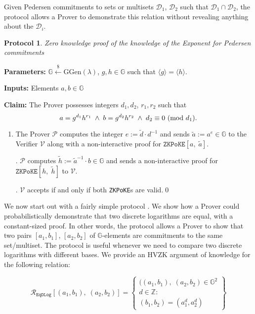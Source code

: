 \documentclass[11pt, lettersize, notitlepage, leqno, footskip=0.6cm]{article}
\newcommand{\ttt}{\texttt}
\newcommand{\bG}{\mathbb{G}}
\newcommand{\la}{\langle}
\newcommand{\ra}{\rangle}
\newcommand{\wti}{\widetilde}
\newcommand{\mc}{\mathcal}
\newcommand{\mb}{\mathbb}
\newcommand{\mr}{\mathrm}
\newcommand{\lamb}{\lambda}
\newcommand{\mP}{\mc{P}}
\newcommand{\V}{\mc{V}}
\newcommand{\vs}{\vspace{-0.15cm}}
\newcommand{\noin}{\noindent}
\newcommand{\Mod}[1]{\ (\mathrm{mod}\ #1)}
\newtheorem{Prot}[Thm]{Protocol}
\numberwithin{equation}{section}
\begin{document}
\noin Given Pedersen commitments to sets or multisets $\mc{D}_1$, $\mc{D}_2$ such that $\mc{D}_1\cap \mc{D}_2$, the protocol allows a Prover to demonstrate this relation without revealing anything about the $\mc{D}_i$.

\begin{Prot} \normalfont \hypertarget{ZKPoKEPed}{\textit{Zero knowledge proof of the knowledge of the Exponent for Pedersen commitments}} \end{Prot} \vspace{-0.3cm}

\noin \textbf{Parameters:} $\mb{G}\xleftarrow{\$} \mr{GGen}(\lamb)$,  $g,h\in \mb{G}$ such that $\la g \ra = \la h \ra$.

\noin \textbf{Inputs:} Elements $a,b\in\bG$

\noin \textbf{Claim:} The Prover possesses integers $d_1,d_2$, $r_1,r_2$ such that \vs $$a = g^{d_1}h^{r_1} \;\wedge\; b = g^{d_2}h^{r_2} \;\wedge\; d_2\equiv 0\Mod{d_1} . \vs $$

\begin{enumerate}[wide, labelwidth=!, labelindent=0pt]\vs \item The Prover $\mP$ computes the integer $e:= \wti{d}\cdot{d}^{-1}$ and sends $\wti{a}:= a^{e}\in \bG$ to the Verifier $\V$ along with a non-interactive proof for $\ttt{ZKPoKE}[a,\;\wti{a}]$.

\noin 2. $\mP$ computes $\wti{h}:= \wti{a}^{-1}\cdot b\in \bG$ and sends a non-interactive proof for $\ttt{ZKPoKE}[h,\;\wti{h}]$ to $\V$.

\noin 3. $\V$ accepts if and only if both \verb|ZKPoKE|s are valid.\qed \end{enumerate}


  

We now start out with a fairly simple protocol . We show how a Prover could probabilistically demonstrate that two discrete logarithms are equal, with a constant-sized proof. In other words, the protocol allows a Prover to show that two pairs $[a_1, b_1]$, $[a_2, b_2]$ of $\bG$-elements are commitments to the same set/multiset. The protocol is useful whenever we need to compare two discrete logarithms with different bases. We provide an HVZK argument of knowledge for  the following relation:\vs

\[
  \mc{R}_{\ttt{EqDLog}}[(a_1, b_1),\;(a_2,b_2)] = \left\{\begin{array}{l}
    ((a_1, b_1),\; (a_2,b_2)\in\mb{G}^2\\
    d\in\mb{Z}: \\
    (b_1,b_2) = (a_1^d,a_2^d)
  \end{array}\right\}
\] \vspace{0.1cm}
\end{document}
